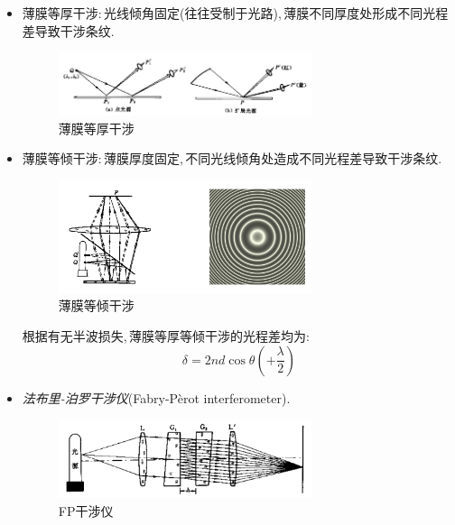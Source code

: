 \begin{itemize}
\item 薄膜等厚干涉:\,光线倾角固定(往往受制于光路),\,薄膜不同厚度处形成不同光程差导致干涉条纹.


\begin{figure}[H]
\centering
\includegraphics[width=0.7\textwidth]{image/14-1-5.png}
\caption{薄膜等厚干涉}
\end{figure}

\item 薄膜等倾干涉:\,薄膜厚度固定,\,不同光线倾角处造成不同光程差导致干涉条纹.

\begin{figure}[H]
\centering
\includegraphics[width=0.7\textwidth]{image/14-1-6.png}
\caption{薄膜等倾干涉}
\end{figure}

根据有无半波损失,\,薄膜等厚等倾干涉的光程差均为:
\[\delta=2nd\cos\theta\left(+\frac{\lambda}{2}\right)\]

\item \emph{法布里-泊罗干涉仪}(Fabry-P\`erot interferometer).

\begin{figure}[H]
\centering
\includegraphics[width=0.7\textwidth]{image/14-1-7.png}
\caption{FP干涉仪}
\end{figure}

\end{itemize}

